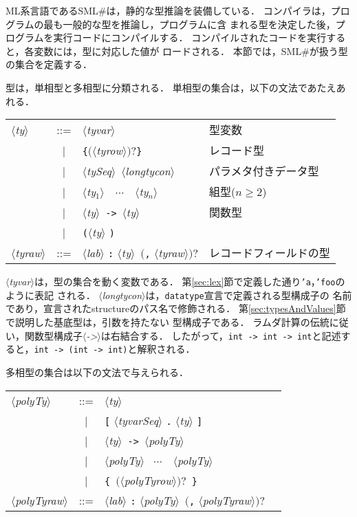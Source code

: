 \documentclass{jbook}
\newcommand{\smlsharp}{SML\#}
\newcommand{\vbar}{\mbox{\ $|$\ }}
\newcommand{\nonterm}[1]{\mbox{$\langle$}{\it #1}\mbox{$\rangle$}}
\newcommand{\term}[1]{\mbox{{\tt #1}}}
\newcommand{\optional}[1]{\mbox{$($}{\protect #1}\mbox{$)?$}}
\begin{document}
	ML系言語である\smlsharp{}は，静的な型推論を装備している．
	コンパイラは，プログラムの最も一般的な型を推論し，プログラムに含
まれる型を決定した後，プログラムを実行コードにコンパイルする．
	コンパイルされたコードを実行すると，各変数には，型に対応した値が
ロードされる．
	本節では，\smlsharp{}が扱う型の集合を定義する．
	
	型は，単相型と多相型に分類される．
	単相型の集合は，以下の文法であたえあれる．

\begin{center}
\begin{tabular}{lcll}
\nonterm{ty} &::=& \nonterm{tyvar}&型変数\\
&\vbar& \term{\{}\optional{\nonterm{tyrow}}\term{\}} &レコード型\\
&\vbar& \nonterm{tySeq}\ \nonterm{longtycon} & パラメタ付きデータ型\\
&\vbar& \nonterm{ty$_1$}\ \term{*}\ $\cdots$\ \term{*}\ \nonterm{ty$_n$} &組型($n\ge 2$)\\
&\vbar& \nonterm{ty}\ \term{->}\ \nonterm{ty}& 関数型\\
&\vbar& \term{(}\nonterm{ty} \term{)}\\
\nonterm{tyraw}&::=& \nonterm{lab} \term{:} \nonterm{ty}\ \optional{\term{,} \nonterm{tyraw}} &レコードフィールドの型
\end{tabular}
\end{center}

	\nonterm{tyvar}は，型の集合を動く変数である．
	第\ref{sec:lex}節で定義した通り{\tt 'a}，{\tt 'foo}のように表記
される．
	\nonterm{longtycon}は，{\tt datatype}宣言で定義される型構成子の
名前であり，宣言されたstructureのパス名で修飾される．
	第\ref{sec:typesAndValues}節で説明した基底型は，引数を持たない
型構成子である．
	ラムダ計算の伝統に従い，関数型構成子\nonterm{->}は右結合する．
	したがって，{\tt int -> int -> int}と記述すると，{\tt int ->
(int -> int)}と解釈される．

	多相型の集合は以下の文法で与えられる．

\begin{center}
\begin{tabular}{lcll}
\nonterm{polyTy} &::=& \nonterm{ty}\\
&\vbar& \term{[} \nonterm{tyvarSeq} \term{.} \nonterm{ty} \term{]}\\
&\vbar& \nonterm{ty}\ \term{->}\ \nonterm{polyTy}\\
&\vbar& \nonterm{polyTy}\ \term{*} $\cdots$\ \term{*}\ \nonterm{polyTy}\\
&\vbar& \term{\{}\ \optional{\nonterm{polyTyrow}}\ \term{\}}\\
\nonterm{polyTyraw}&::=& \nonterm{lab} \term{:} \nonterm{polyTy}\ \optional{\term{,} \nonterm{polyTyraw}} 
\end{tabular}
\end{center}
\end{document}
